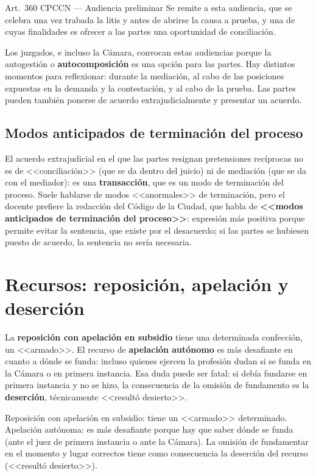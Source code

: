 \documentclass[12pt,oneside]{book}
\begin{document}
\begin{norma}{Art.~360 CPCCN --- Audiencia preliminar}
Se remite a esta audiencia, que se celebra una vez trabada la litis y antes de abrirse la causa a prueba, y una de cuyas finalidades es ofrecer a las partes una oportunidad de conciliaci\'on.
\end{norma}

Los juzgados, e incluso la C\'amara, convocan estas audiencias porque la autogesti\'on o \textbf{autocomposici\'on} es una opci\'on para las partes. Hay distintos momentos para reflexionar: durante la mediaci\'on, al cabo de las posiciones expuestas en la demanda y la contestaci\'on, y al cabo de la prueba. Las partes pueden tambi\'en ponerse de acuerdo extrajudicialmente y presentar un acuerdo.

\subsection{Modos anticipados de terminaci\'on del proceso}

El acuerdo extrajudicial en el que las partes resignan pretensiones rec\'iprocas no es de <<conciliaci\'on>> (que se da dentro del juicio) ni de mediaci\'on (que se da con el mediador): es una \textbf{transacci\'on}, que es un modo de terminaci\'on del proceso. Suele hablarse de modos <<anormales>> de terminaci\'on, pero el docente prefiere la redacci\'on del C\'odigo de la Ciudad, que habla de \textbf{<<modos anticipados de terminaci\'on del proceso>>}: expresi\'on m\'as positiva porque permite evitar la sentencia, que existe por el desacuerdo; si las partes se hubiesen puesto de acuerdo, la sentencia no ser\'ia necesaria.

\section{Recursos: reposici\'on, apelaci\'on y deserci\'on}

La \textbf{reposici\'on con apelaci\'on en subsidio} tiene una determinada confecci\'on, un <<armado>>. El recurso de \textbf{apelaci\'on aut\'onomo} es m\'as desafiante en cuanto a d\'onde se funda: incluso quienes ejercen la profesi\'on dudan si se funda en la C\'amara o en primera instancia. Esa duda puede ser fatal: si deb\'ia fundarse en primera instancia y no se hizo, la consecuencia de la omisi\'on de fundamento es la \textbf{deserci\'on}, t\'ecnicamente <<result\'o desierto>>.

\begin{important}
Reposici\'on con apelaci\'on en subsidio: tiene un <<armado>> determinado. Apelaci\'on aut\'onoma: es m\'as desafiante porque hay que saber d\'onde se funda (ante el juez de primera instancia o ante la C\'amara). La omisi\'on de fundamentar en el momento y lugar correctos tiene como consecuencia la deserci\'on del recurso (<<result\'o desierto>>).
\end{important}
\end{document}
